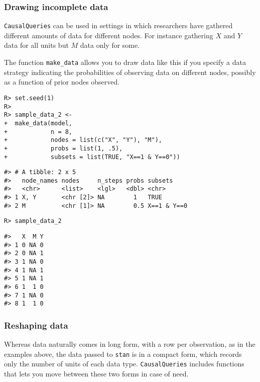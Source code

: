 \documentclass[
  11pt,
  article]{jss}
\begin{document}
\hypertarget{drawing-incomplete-data}{%
\subsubsection{Drawing incomplete data}\label{drawing-incomplete-data}}

\texttt{CausalQueries} can be used in settings in which researchers have
gathered different amounts of data for different nodes. For instance
gathering \(X\) and \(Y\) data for all units but \(M\) data only for
some.

The function \texttt{make\_data} allows you to draw data like this if
you specify a data strategy indicating the probabilities of observing
data on different nodes, possibly as a function of prior nodes observed.

\begin{verbatim}
R> set.seed(1)
R> 
R> sample_data_2 <-
+  make_data(model,
+            n = 8,
+            nodes = list(c("X", "Y"), "M"),
+            probs = list(1, .5),
+            subsets = list(TRUE, "X==1 & Y==0"))
\end{verbatim}

\begin{verbatim}
#> # A tibble: 2 x 5
#>   node_names nodes     n_steps probs subsets    
#>   <chr>      <list>    <lgl>   <dbl> <chr>      
#> 1 X, Y       <chr [2]> NA        1   TRUE       
#> 2 M          <chr [1]> NA        0.5 X==1 & Y==0
\end{verbatim}

\begin{verbatim}
R> sample_data_2
\end{verbatim}

\begin{verbatim}
#>   X  M Y
#> 1 0 NA 0
#> 2 0 NA 1
#> 3 1 NA 0
#> 4 1 NA 1
#> 5 1 NA 1
#> 6 1  1 0
#> 7 1 NA 0
#> 8 1  1 0
\end{verbatim}

\hypertarget{reshaping-data}{%
\subsubsection{Reshaping data}\label{reshaping-data}}

Whereas data naturally comes in long form, with a row per observation,
as in the examples above, the data passed to \texttt{stan} is in a
compact form, which records only the number of units of each data type.
\texttt{CausalQueries} includes functions that lets you move between
these two forms in case of need.
\end{document}
